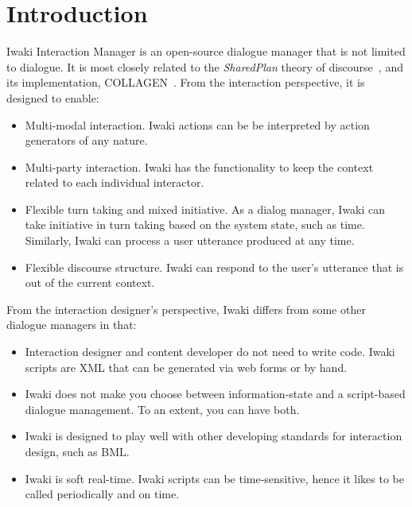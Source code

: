 \chapter{Introduction} %
\label{Chapter1}


Iwaki Interaction Manager is an open-source dialogue manager that is not limited to dialogue. It is most closely related to the \textsl{SharedPlan} theory of discourse~\citep{GrozsSidner1990,Lochbaum1998}, and its implementation, COLLAGEN~\citep{RichSidner1998}. From the interaction perspective, it is designed to enable:
\begin{itemize}
\item Multi-modal interaction. Iwaki actions can be be interpreted by action generators of any nature.
\item Multi-party interaction. Iwaki has the functionality to keep the context related to each individual interactor.
\item Flexible turn taking and mixed initiative. As a dialog manager, Iwaki can take initiative in turn taking based on the system state, such as time. Similarly, Iwaki can process a user utterance produced at any time.
\item Flexible discourse structure. Iwaki can respond to the user's utterance that is out of the current context.
\end{itemize}

From the interaction designer's perspective, Iwaki differs from some other dialogue managers in that:

\begin{itemize}
\item Interaction designer and content developer do not need to write code. Iwaki scripts are XML that can be generated via web forms or by hand.
\item Iwaki does not make you choose between information-state and a script-based dialogue management. To an extent, you can have both.
\item Iwaki is designed to play well with other developing standards for interaction design, such as BML.
\item Iwaki is soft real-time. Iwaki scripts can be time-sensitive, hence it likes to be called periodically and on time.
\end{itemize}

